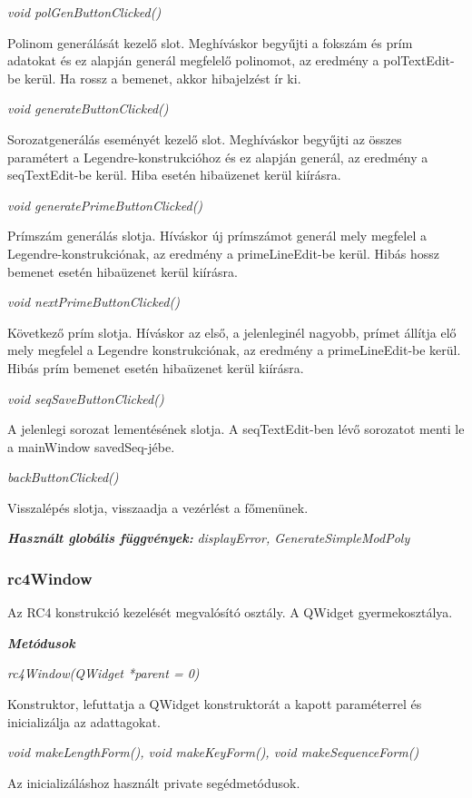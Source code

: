 \documentclass[12pt]{article}
\begin{document}
\textit{void polGenButtonClicked()}

Polinom generálását kezelő slot. Meghíváskor begyűjti a fokszám és prím adatokat és ez alapján generál megfelelő polinomot, az eredmény a polTextEdit-be kerül. Ha rossz a bemenet, akkor hibajelzést ír ki.

\textit{void generateButtonClicked()}

Sorozatgenerálás eseményét kezelő slot. Meghíváskor begyűjti az összes paramétert a Legendre-konstrukcióhoz és ez alapján generál, az eredmény a seqTextEdit-be kerül. Hiba esetén hibaüzenet kerül kiírásra.

\textit{void generatePrimeButtonClicked()}

Prímszám generálás slotja. Híváskor új prímszámot generál mely megfelel a Legendre-konstrukciónak, az eredmény a primeLineEdit-be kerül. Hibás hossz bemenet esetén hibaüzenet kerül kiírásra.

\textit{void nextPrimeButtonClicked()}

Következő prím slotja. Híváskor az első, a jelenleginél nagyobb, prímet állítja elő mely megfelel a Legendre konstrukciónak, az eredmény a primeLineEdit-be kerül. Hibás prím bemenet esetén hibaüzenet kerül kiírásra.

\textit{void seqSaveButtonClicked()}

A jelenlegi sorozat lementésének slotja. A seqTextEdit-ben lévő sorozatot menti le a mainWindow savedSeq-jébe.

\textit{backButtonClicked()}

Visszalépés slotja, visszaadja a vezérlést a főmenünek.

\textbf{\textit{Használt globális függvények: }} \textit{displayError, GenerateSimpleModPoly}

\subsubsection*{rc4Window}

Az RC4 konstrukció kezelését megvalósító osztály. A QWidget gyermekosztálya.

\textit{\textbf{Metódusok}}

\textit{rc4Window(QWidget *parent = 0)}

Konstruktor, lefuttatja a QWidget konstruktorát a kapott paraméterrel és inicializálja az adattagokat.

\textit{void makeLengthForm(), void makeKeyForm(), void makeSequenceForm()}

Az inicializáláshoz használt private segédmetódusok.
\end{document}
